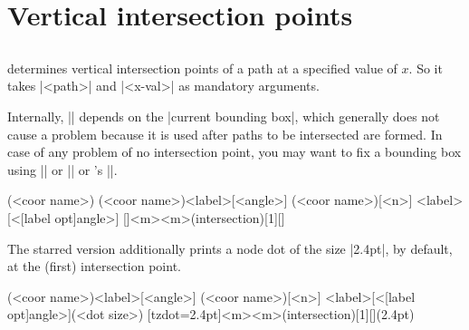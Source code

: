 \section{Vertical intersection points}
\label{s:tzvXpointat}

\subsection{\protect\cmd{\tzvXpointat(*)}}
\label{ss:tzvXpointat}

\icmd{\tzvXpointat} determines vertical intersection points of a path at a specified value of $x$.
So it takes |{<path>}| and |{<x-val>}| as mandatory arguments.

\remark 
Internally, |\tzvXpointat| depends on the |current bounding box|, which generally does not cause a problem because it is used after paths to be intersected are formed.
In case of any problem of no intersection point, you may want to fix a bounding box using  |\tzbbox| or |\tzaxes*| or \Tikz's |\useasboundingbox|.

\begin{tzdef}{}
(<coor name>)
(<coor name>){<label>}[<angle>]
(<coor name>)[<n>]
            {<label>}[<[label opt]angle>]
  []{<m>}{<m>}(intersection)[1]{}[]
\end{tzdef}

The starred version \icmd{\tzvXpointat*} additionally prints a node dot of the size |2.4pt|, by default, at the (first) intersection point.

\begin{tzdef}{}
(<coor name>){<label>}[<angle>]
(<coor name>)[<n>]
             {<label>}[<[label opt]angle>](<dot size>)
  [tzdot=2.4pt]{<m>}{<m>}(intersection)[1]{}[](2.4pt)
\end{tzdef}

\begin{tzcode}{.3}
\end{tzcode}


